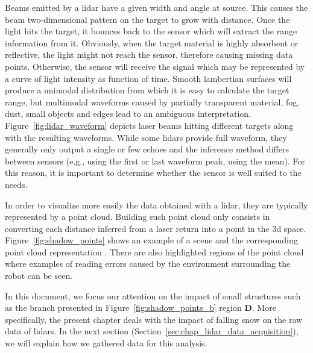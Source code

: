 Beams emitted by a \gls*{lidar} have a given width and angle at source. This causes the beam two-dimensional pattern on the target to grow with distance. Once the light hits the target, it bounces back to the sensor which will extract the range information from it. Obviously, when the target material is highly absorbent or reflective, the light might not reach the sensor, therefore causing missing data points. Otherwise, the sensor will receive the signal which may be represented by a curve of light intensity as function of time. Smooth lambertian surfaces will produce a unimodal distribution from which it is easy to calculate the target range, but multimodal waveforms caused by partially transparent material, fog, dust, small objects and edges lead to an ambiguous interpretation. Figure~\ref{fig:lidar_waveform} depicts laser beams hitting different targets along with the resulting waveforms. While some \gls*{lidar}s provide full waveform, they generally only output a single or few echoes and the inference method differs between sensors (e.g., using the first or last waveform peak, using the mean). For this reason, it is important to determine whether the sensor is well suited to the needs. 

In order to visualize more easily the data obtained with a \gls*{lidar}, they are typically represented by a point cloud. Building such point cloud only consists in converting each distance inferred from a laser return into a point in the \gls*{3d} space. Figure~\ref{fig:shadow_points} shows an example of a scene  and the corresponding point cloud representation . There are also highlighted regions of the point cloud where examples of reading errors caused by the environment surrounding the robot can be seen. 

In this document, we focus our attention on the impact of small structures such as the branch presented in Figure~\ref{fig:shadow_points_b} region \textbf{D}. More specifically, the present chapter deals with the impact of falling snow on the raw data of \gls*{lidar}s. In the next section (Section~\ref{sec:chap_lidar_data_acquisition}), we will explain how we gathered data for this analysis.

